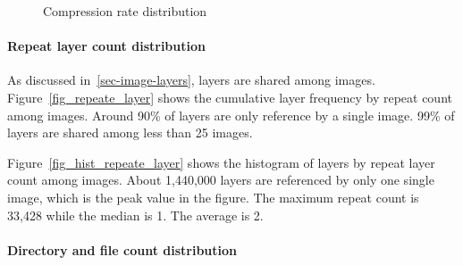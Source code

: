 \begin{figure}[!t]
	\centering
	\caption{Compression rate distribution}
	\label{fig-repeat-layer-cnt}
\end{figure}
\paragraph{Repeat layer count distribution}

As discussed in~\ref{sec-image-layers}, layers are shared among images. Figure~\ref{fig_repeate_layer} shows the cumulative layer frequency by repeat count among images. Around 90\% of layers are only reference by a single image. 99\% of layers are shared among less than 25 images. 

Figure~\ref{fig_hist_repeate_layer} shows the histogram of layers by repeat layer count among images. About 1,440,000 layers are referenced by only one single image, which is the peak value in the figure. The maximum repeat count is 33,428 while the median is 1. The average is 2.
\paragraph{Directory and file count distribution}

